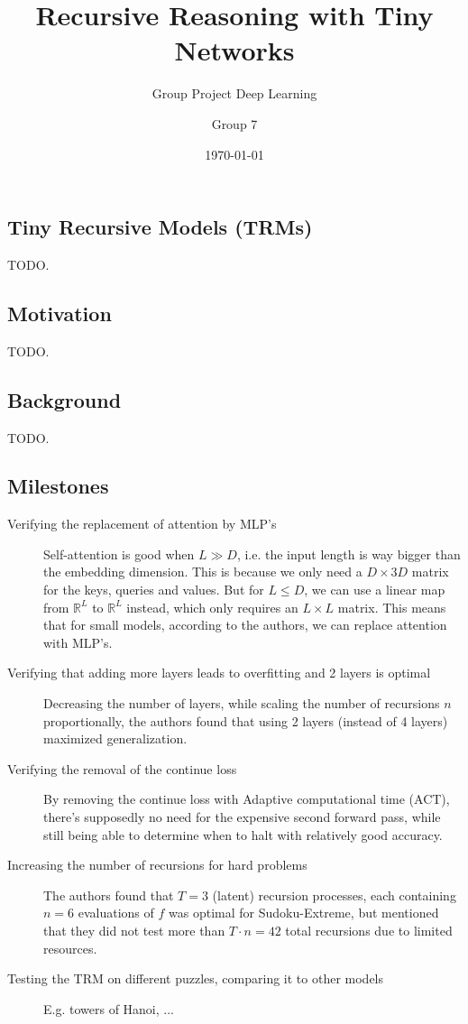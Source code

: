 \documentclass[dtu]{dtuarticle}
\title{Recursive Reasoning with Tiny Networks}
\subtitle{Group Project Deep Learning}
\author{Group 7}
\date{\today}
\begin{document}
	\maketitle

	\subsection*{Tiny Recursive Models (TRMs)}

	TODO.

	\subsection*{Motivation}

	TODO.

	\subsection*{Background}

	TODO.

	\subsection*{Milestones}

	\begin{description}
		\item[Verifying the replacement of attention by MLP's]
		Self-attention is good when $L \gg D$, i.e. the input length is way bigger than the embedding dimension. This is because we only need a $D \times 3D$ matrix for the keys, queries and values. But for $L \leq D$, we can use a linear map from $\mathbb{R}^{L}$ to $\mathbb{R}^{L}$ instead, which only requires an $L \times L$ matrix. This means that for small models, according to the authors, we can replace attention with MLP's.
		\item[Verifying that adding more layers leads to overfitting and 2 layers is optimal]
		Decreasing the number of layers, while scaling the number of recursions $n$ proportionally, the authors found that using 2 layers (instead of 4 layers) maximized generalization.
		\item[Verifying the removal of the continue loss] By removing the continue loss with Adaptive computational time (ACT), there's supposedly no need for the expensive second forward pass, while still being able to determine when to
		halt with relatively good accuracy.
		\item[Increasing the number of recursions for hard problems]
		The authors found that $T=3$ (latent) recursion processes, each containing $n=6$ evaluations of $f$ was optimal for Sudoku-Extreme, but mentioned that they did not test more than $T \cdot n = 42$ total recursions due to limited resources.
		\item[Testing the TRM on different puzzles, comparing it to other models]
		E.g. towers of Hanoi, ...
	\end{description}

	\nocite{paper}

	
	
\end{document}
